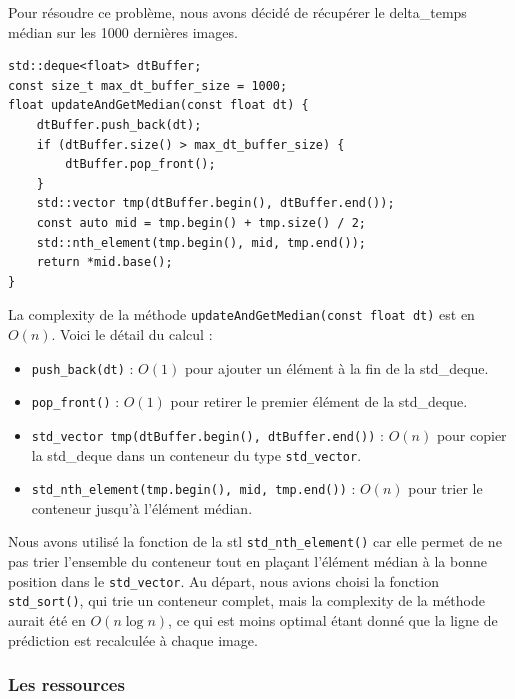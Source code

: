 Pour résoudre ce problème, nous avons décidé de récupérer le \gls{delta_temps} médian sur les 1000 dernières images.

\begin{lstlisting}[style=CStyle, label={lst:code_dequeue_dt}]
std::deque<float> dtBuffer;
const size_t max_dt_buffer_size = 1000;
float updateAndGetMedian(const float dt) {
    dtBuffer.push_back(dt);
    if (dtBuffer.size() > max_dt_buffer_size) {
        dtBuffer.pop_front();
    }
    std::vector tmp(dtBuffer.begin(), dtBuffer.end());
    const auto mid = tmp.begin() + tmp.size() / 2;
    std::nth_element(tmp.begin(), mid, tmp.end());
    return *mid.base();
}
\end{lstlisting}

La \gls{complexity} de la méthode \texttt{updateAndGetMedian(const float dt)} est en \( O(n) \).
Voici le détail du calcul :
\begin{itemize}
    \item \texttt{push\_back(dt)} : \( O(1) \)\cite{cpp_reference_push_back} pour ajouter un élément à la fin de la \gls{std_deque}.
    \item \texttt{pop\_front()} : \( O(1) \)\cite{cpp_reference_pop_front} pour retirer le premier élément de la \gls{std_deque}.
    \item \texttt{\gls{std_vector} tmp(dtBuffer.begin(), dtBuffer.end())} : \( O(n) \)\cite{cpp_reference_vector} pour copier la \gls{std_deque} dans un conteneur du type \texttt{\gls{std_vector}}.
    \item \texttt{\gls{std_nth_element}(tmp.begin(), mid, tmp.end())} : \( O(n) \)\cite{cpp_reference_std_nth_element} pour trier le conteneur jusqu'à l'élément médian.
\end{itemize}

Nous avons utilisé la fonction de la \gls{stl} \texttt{\gls{std_nth_element}()}\cite{cpp_reference_std_nth_element} car elle permet de ne pas trier l'ensemble du conteneur tout en plaçant l'élément médian à la bonne position dans le \texttt{\gls{std_vector}}\cite{cpp_reference_vector}.
Au départ, nous avions choisi la fonction \texttt{\gls{std_sort}()}, qui trie un conteneur complet, mais la \gls{complexity} de la méthode aurait été en \( O(n \log n) \)\cite{cpp_reference_std_sort}, ce qui est moins optimal étant donné que la ligne de prédiction est recalculée à chaque image.


\subsubsection{Les ressources}\label{subsubsec:gestion-des-ressources}
